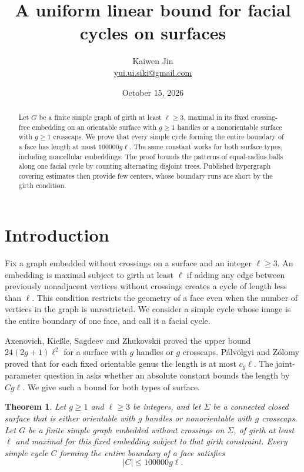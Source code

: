 \documentclass[11pt]{article}
\title{A uniform linear bound for facial cycles on surfaces}
\author{Kaiwen Jin\\ \small\href{mailto:yui.ui.siki@gmail.com}{yui.ui.siki@gmail.com}}
\date{October 15, 2026}
\newtheorem{theorem}{Theorem}
\theoremstyle{remark}
\begin{document}
\maketitle
\begin{abstract}
Let $G$ be a finite simple graph of girth at least $\ell\ge3$, maximal
in its fixed crossing-free embedding on an orientable surface with
$g\ge1$ handles or a nonorientable surface with $g\ge1$ crosscaps.
We prove that every simple cycle forming the entire boundary of a face
has length at most $100000g\ell$. The same constant works for both
surface types, including noncellular embeddings.
The proof bounds the patterns of equal-radius balls along one facial
cycle by counting alternating disjoint trees. Published hypergraph
covering estimates then provide few centers, whose boundary runs are
short by the girth condition.
\end{abstract}

\section{Introduction}

Fix a graph embedded without crossings on a surface and an integer
$\ell\ge3$. An embedding is maximal subject to girth at least $\ell$
if adding any edge between previously nonadjacent vertices without
crossings creates a cycle of length less than $\ell$. This condition
restricts the geometry of a face even when the number of vertices in
the graph is unrestricted. We consider a simple cycle whose image is
the entire boundary of one face, and call it a facial cycle.

Axenovich, Kie{\ss}le, Sagdeev and Zhukovskii
\cite[Theorem~2]{Axenovich} proved the upper bound
$24(2g+1)\ell^2$ for a surface with $g$ handles or $g$ crosscaps.
P\'alv\"olgyi and Z\'olomy \cite[Theorem~3]{PalvolgyiZolomy} proved that
for each fixed orientable genus the length is at most $c_g\ell$.
The joint-parameter question in \cite[Question~2]{Axenovich} asks
whether an absolute constant bounds the length by $Cg\ell$.
We give such a bound for both types of surface.

\begin{theorem}\label{thm:main}
Let $g\ge1$ and $\ell\ge3$ be integers, and let $\Sigma$ be a connected
closed surface that is either orientable with $g$ handles or
nonorientable with $g$ crosscaps. Let $G$ be a finite simple graph
embedded without crossings on $\Sigma$, of girth at least $\ell$ and
maximal for this fixed embedding subject to that girth constraint.
Every simple cycle $C$ forming the entire boundary of a face satisfies
\[
|C|\le100000g\ell.
\]
\end{theorem}
\end{document}
